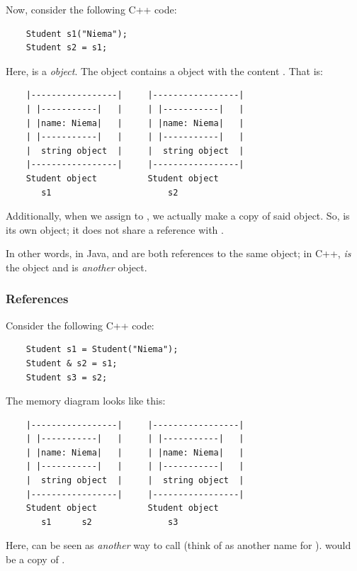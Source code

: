 \documentclass[letterpaper]{article}
\begin{document}
\bigskip 

Now, consider the following C++ code: 
\begin{verbatim}
    Student s1("Niema");
    Student s2 = s1;
\end{verbatim}
Here,  is a  \emph{object}. The  object contains a  object with the content . That is:
\begin{verbatim}
    |-----------------|     |-----------------|
    | |-----------|   |     | |-----------|   |
    | |name: Niema|   |     | |name: Niema|   |
    | |-----------|   |     | |-----------|   |
    |  string object  |     |  string object  |
    |-----------------|     |-----------------|
    Student object          Student object
       s1                       s2
\end{verbatim} 
Additionally, when we assign  to , we actually make a copy of said object. So,  is its own object; it does not share a reference with .

\bigskip 

In other words, in Java,  and  are both references to the same object; in C++,  \emph{is} the object and  is \emph{another} object.

\subsubsection{References}
Consider the following C++ code: 
\begin{verbatim}
    Student s1 = Student("Niema");
    Student & s2 = s1;
    Student s3 = s2;
\end{verbatim}
The memory diagram looks like this: 
\begin{verbatim}
    |-----------------|     |-----------------|
    | |-----------|   |     | |-----------|   |
    | |name: Niema|   |     | |name: Niema|   |
    | |-----------|   |     | |-----------|   |
    |  string object  |     |  string object  |
    |-----------------|     |-----------------|
    Student object          Student object 
       s1      s2               s3
\end{verbatim} 
Here,  can be seen as \emph{another} way to call  (think of  as another name for ).  would be a copy of . 
\end{document}
